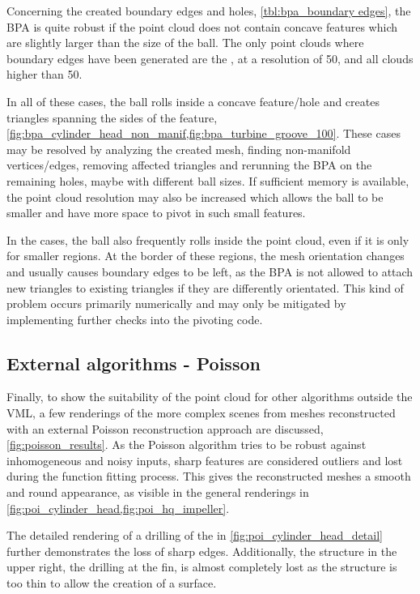 Concerning the created boundary edges and holes, \cf \cref{tbl:bpa_boundary edges}, the BPA is quite robust if the point cloud does not contain concave features which are slightly larger than the size of the ball.
The only point clouds where boundary edges have been generated are the \cylinderhead, at a resolution of 50, and all \turbine clouds higher than 50.

In all of these cases, the ball rolls inside a concave feature/hole and creates triangles spanning the sides of the feature, \cf \cref{fig:bpa_cylinder_head_non_manif,fig:bpa_turbine_groove_100}.
These cases may be resolved by analyzing the created mesh, finding non-manifold vertices/edges, removing affected triangles and rerunning the BPA on the remaining holes, maybe with different ball sizes.
If sufficient memory is available, the point cloud resolution may also be increased which allows the ball to be smaller and have more space to pivot in such small features.

In the \turbine cases, the ball also frequently rolls inside the point cloud, even if it is only for smaller regions.
At the border of these regions, the mesh orientation changes and usually causes boundary edges to be left, as the BPA is not allowed to attach new triangles to existing triangles if they are differently orientated.
This kind of problem occurs primarily numerically and may only be mitigated by implementing further checks into the pivoting code.


\subsection{External algorithms - Poisson}

Finally, to show the suitability of the point cloud for other algorithms outside the VML, a few renderings of the more complex scenes from meshes reconstructed with an external Poisson reconstruction approach are discussed, \cf \cref{fig:poisson_results}.
As the Poisson algorithm tries to be robust against inhomogeneous and noisy inputs, sharp features are considered outliers and lost during the function fitting process.
This gives the reconstructed meshes a smooth and round appearance, as visible in the general renderings in \cref{fig:poi_cylinder_head,fig:poi_hq_impeller}.

The detailed rendering of a drilling of the \cylinderhead in \cref{fig:poi_cylinder_head_detail} further demonstrates the loss of sharp edges.
Additionally, the structure in the upper right, the drilling at the fin, is almost completely lost as the structure is too thin to allow the creation of a surface.

